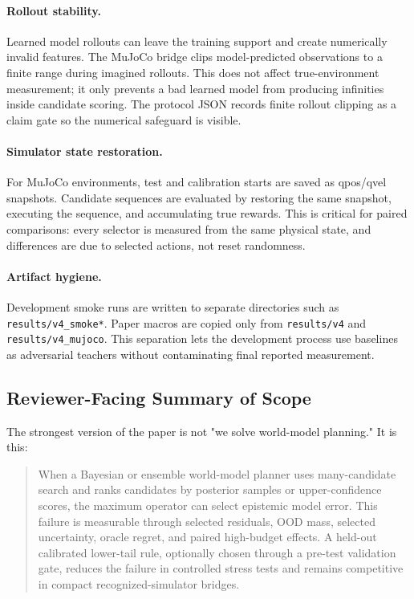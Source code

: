 \documentclass{article}
\begin{document}
\paragraph{Rollout stability.}
Learned model rollouts can leave the training support and create numerically
invalid features. The MuJoCo bridge clips model-predicted observations to a
finite range during imagined rollouts. This does not affect true-environment
measurement; it only prevents a bad learned model from producing infinities
inside candidate scoring. The protocol JSON records finite rollout clipping as
a claim gate so the numerical safeguard is visible.

\paragraph{Simulator state restoration.}
For MuJoCo environments, test and calibration starts are saved as qpos/qvel
snapshots. Candidate sequences are evaluated by restoring the same snapshot,
executing the sequence, and accumulating true rewards. This is critical for
paired comparisons: every selector is measured from the same physical state,
and differences are due to selected actions, not reset randomness.

\paragraph{Artifact hygiene.}
Development smoke runs are written to separate directories such as
\texttt{results/v4\_smoke*}. Paper macros are copied only from
\texttt{results/v4} and \texttt{results/v4\_mujoco}. This separation lets the
development process use baselines as adversarial teachers without contaminating
final reported measurement.

\subsection{Reviewer-Facing Summary of Scope}

The strongest version of the paper is not "we solve world-model planning." It
is this:
\begin{quote}
When a Bayesian or ensemble world-model planner uses many-candidate search and
ranks candidates by posterior samples or upper-confidence scores, the maximum
operator can select epistemic model error. This failure is measurable through
selected residuals, OOD mass, selected uncertainty, oracle regret, and paired
high-budget effects. A held-out calibrated lower-tail rule, optionally chosen
through a pre-test validation gate, reduces the failure in controlled stress
tests and remains competitive in compact recognized-simulator bridges.
\end{quote}
\end{document}
